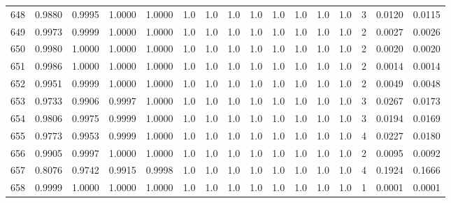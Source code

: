 \begin{tabular}{lrrrrrrrrrrrrrrr}
648 &      0.9880 &  0.9995 &  1.0000 &  1.0000 &     1.0 &     1.0 &     1.0 &     1.0 &     1.0 &     1.0 &      1.0 &        1.0 &      3 &                    0.0120 &                     0.0115 \\
649 &      0.9973 &  0.9999 &  1.0000 &  1.0000 &     1.0 &     1.0 &     1.0 &     1.0 &     1.0 &     1.0 &      1.0 &        1.0 &      2 &                    0.0027 &                     0.0026 \\
650 &      0.9980 &  1.0000 &  1.0000 &  1.0000 &     1.0 &     1.0 &     1.0 &     1.0 &     1.0 &     1.0 &      1.0 &        1.0 &      2 &                    0.0020 &                     0.0020 \\
651 &      0.9986 &  1.0000 &  1.0000 &  1.0000 &     1.0 &     1.0 &     1.0 &     1.0 &     1.0 &     1.0 &      1.0 &        1.0 &      2 &                    0.0014 &                     0.0014 \\
652 &      0.9951 &  0.9999 &  1.0000 &  1.0000 &     1.0 &     1.0 &     1.0 &     1.0 &     1.0 &     1.0 &      1.0 &        1.0 &      2 &                    0.0049 &                     0.0048 \\
653 &      0.9733 &  0.9906 &  0.9997 &  1.0000 &     1.0 &     1.0 &     1.0 &     1.0 &     1.0 &     1.0 &      1.0 &        1.0 &      3 &                    0.0267 &                     0.0173 \\
654 &      0.9806 &  0.9975 &  0.9999 &  1.0000 &     1.0 &     1.0 &     1.0 &     1.0 &     1.0 &     1.0 &      1.0 &        1.0 &      3 &                    0.0194 &                     0.0169 \\
655 &      0.9773 &  0.9953 &  0.9999 &  1.0000 &     1.0 &     1.0 &     1.0 &     1.0 &     1.0 &     1.0 &      1.0 &        1.0 &      4 &                    0.0227 &                     0.0180 \\
656 &      0.9905 &  0.9997 &  1.0000 &  1.0000 &     1.0 &     1.0 &     1.0 &     1.0 &     1.0 &     1.0 &      1.0 &        1.0 &      2 &                    0.0095 &                     0.0092 \\
657 &      0.8076 &  0.9742 &  0.9915 &  0.9998 &     1.0 &     1.0 &     1.0 &     1.0 &     1.0 &     1.0 &      1.0 &        1.0 &      4 &                    0.1924 &                     0.1666 \\
658 &      0.9999 &  1.0000 &  1.0000 &  1.0000 &     1.0 &     1.0 &     1.0 &     1.0 &     1.0 &     1.0 &      1.0 &        1.0 &      1 &                    0.0001 &                     0.0001 \\

\end{tabular}
